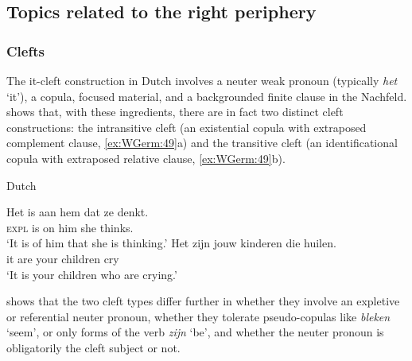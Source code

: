 \documentclass[output=paper,hidelinks]{langscibook}
\begin{document}
\subsection{Topics related to the right periphery\label{sec:Germanic:rightperi}}

\subsubsection{Clefts}

The it-cleft construction in Dutch involves a neuter weak pronoun
(typically \textit{het} `it'), a copula, focused material, and a
backgrounded finite
clause in the Nachfeld.  shows that, with these
ingredients, there are in fact two distinct cleft constructions: the
intransitive cleft (an existential copula with extraposed complement
clause, \ref{ex:WGerm:49}a) and the transitive cleft (an identificational copula
with extraposed relative clause, \ref{ex:WGerm:49}b).
%
\begin{exe}
  \ex\label{ex:WGerm:49} Dutch 
  \begin{xlist}
    \ex \gll Het is aan hem dat ze denkt.\\
             \textsc{expl}  is on him \COMPL{} she thinks.\\
        \glt `It is of him that she is thinking.'
    \ex \gll Het zijn jouw kinderen die huilen.\\
             it  are  your children \REL{} cry\\
         \glt `It is your children who are crying.'
  \end{xlist}
  \end{exe}
%
 shows that the two cleft types differ
further in whether they involve an expletive or referential neuter
pronoun, whether they tolerate pseudo-copulas like \textit{bleken}
`seem', or only forms of the verb \textit{zijn} `be', and whether the
neuter pronoun is obligatorily the cleft subject or not.
\end{document}
